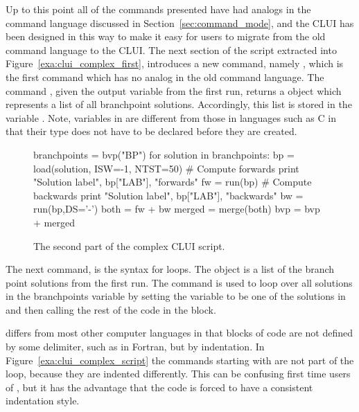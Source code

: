 \documentclass[12pt]{report}
\begin{document}
 Up to this point all of the commands presented have had
 analogs in the command language discussed in 
 Section~\ref{sec:command_mode}, and the \AUTO CLUI has
 been designed in this way to make it easy for users to
 migrate from the old command language to the
 \AUTO CLUI.  The next section of the script extracted into
 Figure~\ref{exa:clui_complex_first}, introduces a new
 command, namely ,
 which is the first command which has no analog in the 
 old command language.
 The command , given the output variable 
 from the first run, returns a \python object which represents a list
 of all branchpoint solutions.
 Accordingly, this list is stored in the \python
 variable .
 Note, variables in \python are different from those in languages
 such as {\cal C} in that their type does not have to be
 declared before they are created.

 \begin{figure}[htbp]
 {\small \begin{center} \begin{boxedverbatim}
 branchpoints = bvp("BP")
 for solution in branchpoints:
     bp = load(solution, ISW=-1, NTST=50)
     # Compute forwards
     print "Solution label", bp["LAB"], "forwards"
     fw = run(bp)
     # Compute backwards
     print "Solution label", bp["LAB"], "backwards"
     bw = run(bp,DS='-')
     both = fw + bw
     merged = merge(both)
     bvp = bvp + merged
 \end{boxedverbatim}
 \end{center} 
 }
 \caption[The second part of the  complex \AUTO CLUI script.]
 {The second part of the  complex \AUTO CLUI script.}
 \label{exa:clui_complex_second}
 \end{figure}

 The next command,  is
 the \python syntax for loops.  The  object
 is a list of the branch point solutions from the first run.
 The command 
  is used to loop
 over all solutions in the branchpoints variable by 
 setting the variable  to
 be one of the solutions in 
 and then calling the rest of the code in the
 block.  

 \python differs from most other computer languages in that
 blocks of code are not defined by some delimiter, such
 as  in {\cal Fortran}, but by indentation.  
 In Figure~\ref{exa:clui_complex_script} the commands starting with
  are not
 part of the loop, because they are indented 
 differently.  This can be confusing first time users of \python,
 but it has the advantage that the code
 is forced to have a consistent indentation style.
\end{document}
